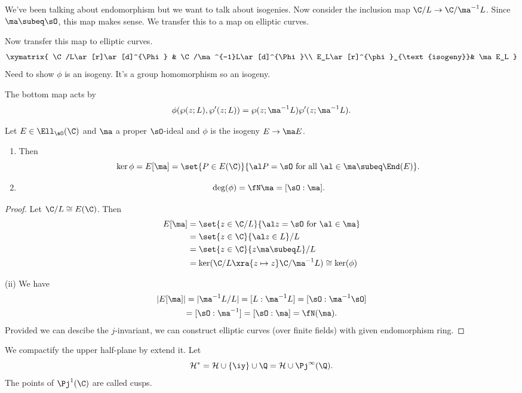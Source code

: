 We've been talking about endomorphism but we want to talk about isogenies.
Now consider the inclusion map $\C/L \to \C/\ma^{-1}L$. Since $\ma\subeq \sO$, this map makes sense.
We transfer this to a map on elliptic curves.

Now transfer this map to elliptic curves.
\[
\xymatrix{
\C/L\ar[r]\ar[d]^{\Phi} & \C/\ma^{-1}L\ar[d]^{\Phi}\\
E_L\ar[r]^{\phi}_{\text{isogeny}}& \ma E_L
}
\]%
Need to show $\phi$ is an isogeny.
It's a group homomorphism so an isogeny.

The bottom map acts by
\[
\phi(\wp(z;L),\wp'(z;L))=\wp(z;\ma^{-1}L)\wp'(z;\ma^{-1}L).
\]
\begin{thm}
Let $E\in \Ell_{\sO}(\C)$ and $\ma$ a proper $\sO$-ideal and $\phi$ is the isogeny $E\to \ma E$. 
\begin{enumerate}
\item
Then
\[
\ker\phi=E[\ma]
=\set{P\in E(\C)}{\al P=\sO\text{ for all }\al\in \ma\subeq \End(E)}.
\]
\item %
\[
\deg(\phi)=\fN\ma=[\sO:\ma].
\]
\end{enumerate}
\end{thm}
\begin{proof}
Let $\C/L\cong E(\C)$. Then 
\begin{align*}
E[\ma]&=\set{z\in \C/L}{\al z=\sO\text{ for }\al\in \ma}\\
&=\set{z\in \C}{\al z\in L}/L\\
&=\set{z\in \C}{z\ma\subeq L}/L\\
&=\ker(\C/L\xra{z\mapsto z}\C/\ma^{-1}L)\cong \ker(\phi)
\end{align*}

(ii) We have
\begin{multline*}
|E[\ma]|=|\ma^{-1}L/L|=[L:\ma^{-1} L] =[\sO:\ma^{-1}\sO]\\
=[\sO:\ma^{-1}]=[\sO:\ma]=\fN(\ma).
\end{multline*}
Provided we can descibe the $j$-invariant, we can construct elliptic curves (over finite fields) with given endomorphism ring.
\end{proof}
We compactify the upper half-plane by extend it. Let
\[
\cal H^*= \cal H\cup \{\iy\}\cup \Q= \cal H\cup\Pj^1(\Q). 
\]
The points of $\Pj^1(\C)$ are called cusps.


